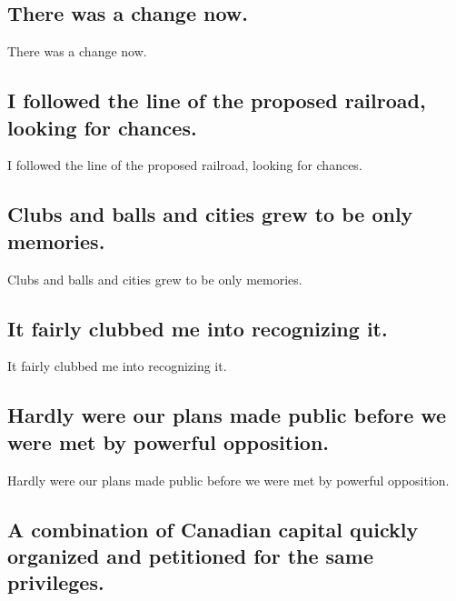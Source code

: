 \documentclass[]{article}
\begin{document}
\hypertarget{there-was-a-change-now.}{%
\subsection{There was a change now.}\label{there-was-a-change-now.}}

There was a change now.

\hypertarget{i-followed-the-line-of-the-proposed-railroad-looking-for-chances.}{%
\subsection{I followed the line of the proposed railroad, looking for
chances.}\label{i-followed-the-line-of-the-proposed-railroad-looking-for-chances.}}

I followed the line of the proposed railroad, looking for chances.

\hypertarget{clubs-and-balls-and-cities-grew-to-be-only-memories.}{%
\subsection{Clubs and balls and cities grew to be only
memories.}\label{clubs-and-balls-and-cities-grew-to-be-only-memories.}}

Clubs and balls and cities grew to be only memories.

\hypertarget{it-fairly-clubbed-me-into-recognizing-it.}{%
\subsection{It fairly clubbed me into recognizing
it.}\label{it-fairly-clubbed-me-into-recognizing-it.}}

It fairly clubbed me into recognizing it.

\hypertarget{hardly-were-our-plans-made-public-before-we-were-met-by-powerful-opposition.}{%
\subsection{Hardly were our plans made public before we were met by
powerful
opposition.}\label{hardly-were-our-plans-made-public-before-we-were-met-by-powerful-opposition.}}

Hardly were our plans made public before we were met by powerful
opposition.

\hypertarget{a-combination-of-canadian-capital-quickly-organized-and-petitioned-for-the-same-privileges.}{%
\subsection{A combination of Canadian capital quickly organized and
petitioned for the same
privileges.}\label{a-combination-of-canadian-capital-quickly-organized-and-petitioned-for-the-same-privileges.}}
\end{document}
